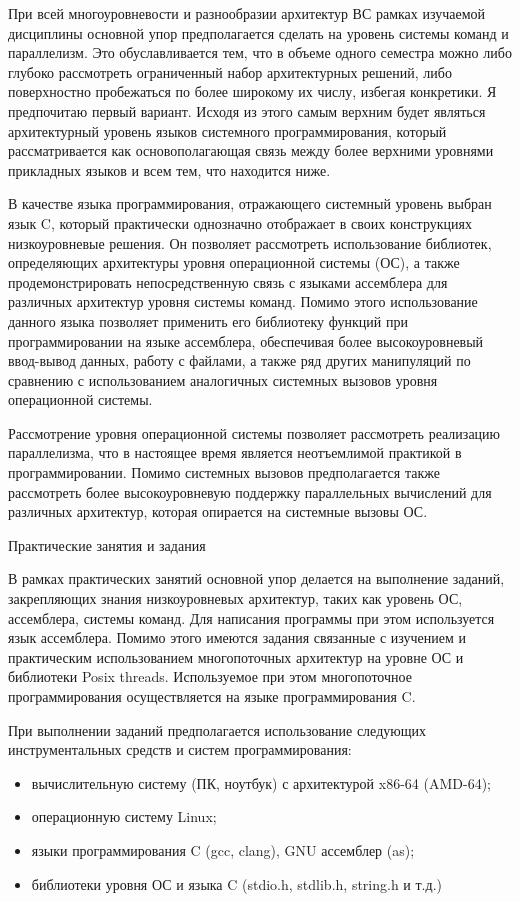 При всей многоуровневости и разнообразии архитектур ВС рамках изучаемой дисциплины основной упор предполагается сделать на уровень системы команд и параллелизм. Это обуславливается тем, что в объеме одного семестра можно либо глубоко рассмотреть ограниченный набор архитектурных решений, либо поверхностно пробежаться по более широкому их числу, избегая конкретики. Я предпочитаю первый вариант. Исходя из этого самым верхним будет являться архитектурный уровень языков системного программирования, который рассматривается как основополагающая связь между более верхними уровнями прикладных языков и всем тем, что находится ниже.

В качестве языка программирования, отражающего системный уровень выбран язык C, который практически однозначно отображает в своих конструкциях низкоуровневые решения. Он позволяет рассмотреть использование библиотек, определяющих архитектуры уровня операционной системы (ОС), а также продемонстрировать непосредственную связь с языками ассемблера для различных архитектур уровня системы команд. Помимо этого использование данного языка позволяет применить его библиотеку функций при программировании на языке ассемблера, обеспечивая более высокоуровневый ввод-вывод данных, работу с файлами, а также ряд других манипуляций по сравнению с использованием аналогичных системных вызовов уровня операционной системы.

Рассмотрение уровня операционной системы позволяет рассмотреть реализацию параллелизма, что в настоящее время является неотъемлимой практикой в программировании. Помимо системных вызовов предполагается также рассмотреть более высокоуровневую поддержку параллельных вычислений для различных архитектур, которая опирается на системные вызовы ОС.


Практические занятия и задания

В рамках практических занятий основной упор делается на выполнение заданий, закрепляющих знания низкоуровневых архитектур, таких как уровень ОС, ассемблера, системы команд. Для написания программы при этом используется язык ассемблера. Помимо этого имеются задания связанные с изучением и практическим использованием многопоточных архитектур на уровне ОС и библиотеки Posix threads. Используемое при этом многопоточное программирования осуществляется на языке программирования C.

При выполнении заданий предполагается использование следующих инструментальных средств и систем программирования:

\begin{itemize}
    \item вычислительную систему (ПК, ноутбук) с архитектурой x86-64 (AMD-64);
    \item операционную систему Linux;
    \item языки программирования C (gcc, clang), GNU ассемблер (as);
    \item библиотеки уровня ОС и языка C (stdio.h, stdlib.h, string.h и т.д.)
\end{itemize}

